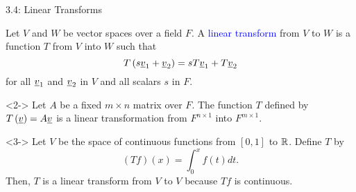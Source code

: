 \documentclass[10pt,letterpaper,english]{beamer}
\begin{document}
\begin{frame}{3.4: Linear Transforms}

\begin{definition}
Let $V$ and $W$ be vector spaces over a field $F$.
A \textcolor{blue}{linear transform} from $V$ to $W$ is a function $T$ from $V$ into $W$ such that
\begin{equation*}
T \left( s \underline{v}_1 + \underline{v}_2 \right)
= s T \underline{v}_1 + T \underline{v}_2
\end{equation*}
for all $\underline{v}_1$ and $\underline{v}_2$ in $V$ and all scalars $s$ in $F$.
\end{definition}

\begin{example}<2->
Let $A$ be a fixed $m \times n$ matrix over $F$.
The function $T$ defined by $T \left( \underline{v} \right) = A \underline{v}$ is a linear transformation from $F^{n \times 1}$ into $F^{m \times 1}$.
\end{example}

\begin{example}<3->
Let $V$ be the space of continuous functions from $[0,1]$ to $\mathbb{R}$. Define $T$ by
\begin{equation*}
(Tf)(x) = \int_{0}^x f(t) dt .
\end{equation*}
Then, $T$ is a linear transform from $V$ to $V$ because $Tf$ is continuous.
\end{example}

\end{frame}
\end{document}
